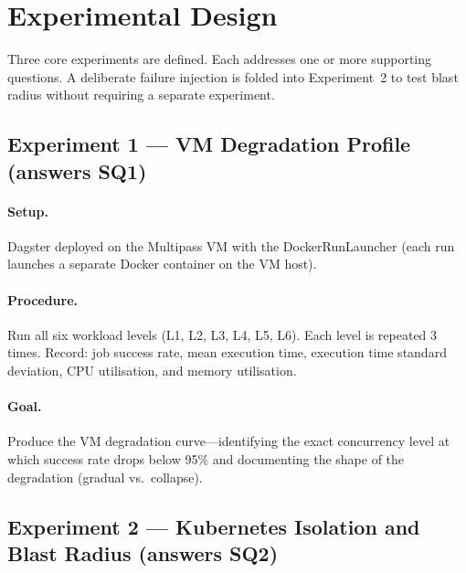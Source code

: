 
\section{Experimental Design}
\label{sec:experiments}

Three core experiments are defined. Each addresses one or more supporting questions. A deliberate failure injection is folded into Experiment~2 to test blast radius without requiring a separate experiment.

\subsection{Experiment 1 --- VM Degradation Profile (answers SQ1)}
\label{subsec:exp1}

\paragraph{Setup.} Dagster deployed on the Multipass VM with the DockerRunLauncher (each run launches a separate Docker container on the VM host).

\paragraph{Procedure.} Run all six workload levels (L1, L2, L3, L4, L5, L6). Each level is repeated 3 times. Record: job success rate, mean execution time, execution time standard deviation, CPU utilisation, and memory utilisation.

\paragraph{Goal.} Produce the VM degradation curve---identifying the exact concurrency level at which success rate drops below 95\% and documenting the shape of the degradation (gradual vs.\ collapse).

\subsection{Experiment 2 --- Kubernetes Isolation and Blast Radius (answers SQ2)}
\label{subsec:exp2}

